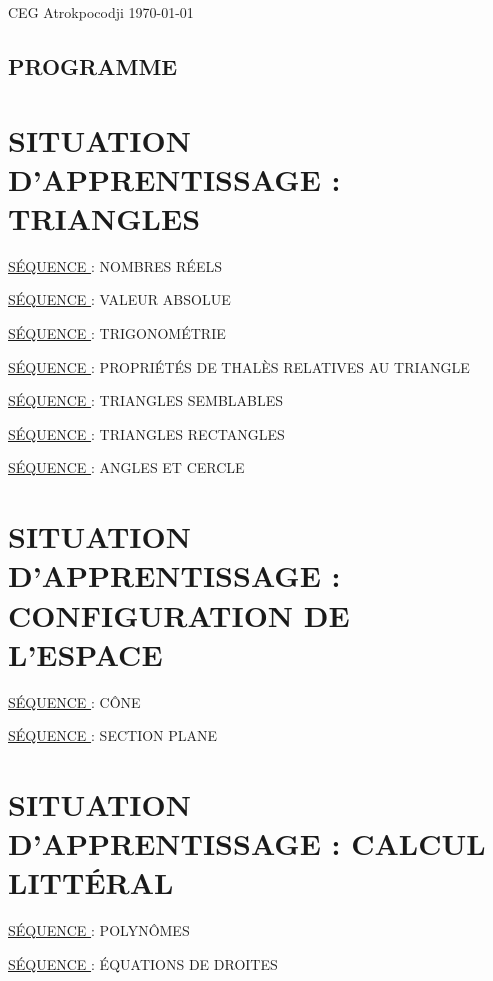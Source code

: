 \begin{titlepage}
 		\begin{center}
 		\end{center}
 		\vspace*{1cm}
 		\begin{center}
 		{\Large CEG Atrokpocodji  \today }
 		\end{center}
 	\end{titlepage}
 	\restoregeometry
  \begin{center}
  	\section*{PROGRAMME }
  \end{center}
  \section*{SITUATION D’APPRENTISSAGE  : TRIANGLES}
  
  \underline{SÉQUENCE } : NOMBRES RÉELS
  
  \underline{SÉQUENCE } : VALEUR ABSOLUE
  
  \underline{SÉQUENCE } : TRIGONOMÉTRIE
  
  \underline{SÉQUENCE } : PROPRIÉTÉS DE THALÈS RELATIVES AU TRIANGLE
  
  \underline{SÉQUENCE }: TRIANGLES SEMBLABLES
  
  \underline{SÉQUENCE }: TRIANGLES RECTANGLES 
  
  \underline{SÉQUENCE }: ANGLES ET CERCLE
  
  \section*{SITUATION D’APPRENTISSAGE  : CONFIGURATION DE L’ESPACE} 
  
  \underline{SÉQUENCE }: CÔNE
  
  \underline{SÉQUENCE }: SECTION PLANE
  
  \section*{SITUATION D’APPRENTISSAGE  : CALCUL LITTÉRAL }
  
  \underline{SÉQUENCE } : POLYNÔMES
  
  \underline{SÉQUENCE } : ÉQUATIONS DE DROITES 
  
